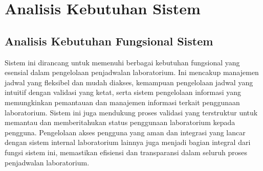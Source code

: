 \section{Analisis Kebutuhan Sistem}
\subsection{Analisis Kebutuhan Fungsional Sistem}
Sistem ini dirancang untuk memenuhi berbagai kebutuhan fungsional yang esensial dalam pengelolaan penjadwalan laboratorium. Ini mencakup manajemen jadwal yang fleksibel dan mudah diakses, kemampuan pengelolaan jadwal yang intuitif dengan validasi yang ketat, serta sistem pengelolaan informasi yang memungkinkan pemantauan dan manajemen informasi terkait penggunaan laboratorium. Sistem ini juga mendukung proses validasi yang terstruktur  untuk memantau dan memberitahukan status penggunaan laboratorium kepada pengguna. Pengelolaan akses pengguna yang aman dan integrasi yang lancar dengan sistem internal laboratorium lainnya juga menjadi bagian integral dari fungsi sistem ini, memastikan efisiensi dan transparansi dalam seluruh proses penjadwalan laboratorium.

